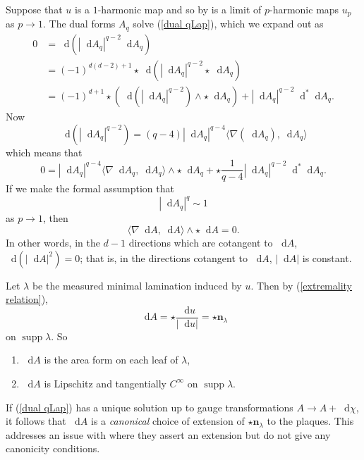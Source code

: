 \documentclass[reqno,12pt]{amsart}
\DeclareMathOperator{\supp}{supp}
\newcommand{\normal}{\mathbf n}
\newcommand*\dif{\mathop{}\!\mathrm{d}}
\theoremstyle{definition}
\numberwithin{equation}{section}
\begin{document}
Suppose that $u$ is a $1$-harmonic map and so by \cite{Mazon14} is a limit of $p$-harmonic maps $u_p$ as $p \to 1$.
The dual forms $A_q$ solve (\ref{dual qLap}), which we expand out as 
\begin{align*}
0
&= \dif(|\dif A_q|^{q - 2} \dif A_q) \\
&= (-1)^{d(d - 2) + 1} \star \dif(|\dif A_q|^{q - 2} \star \dif A_q) \\
&= (-1)^{d + 1} \star(\dif(|\dif A_q|^{q - 2}) \wedge \star \dif A_q) + |\dif A_q|^{q - 2} \dif^* \dif A_q.
\end{align*}
Now
$$\dif(|\dif A_q|^{q - 2}) = (q - 4) |\dif A_q|^{q - 4} \langle \nabla (\dif A_q), \dif A_q \rangle$$
which means that 
$$0 = |\dif A_q|^{q - 4} \langle \nabla \dif A_q, \dif A_q \rangle \wedge \star \dif A_q + \star \frac{1}{q - 4} |\dif A_q|^{q - 2} \dif^* \dif A_q.$$
If we make the formal assumption that 
$$|\dif A_q|^q \sim 1$$
as $p \to 1$, then 
$$\langle \nabla \dif A, \dif A\rangle \wedge \star \dif A = 0.$$
In other words, in the $d - 1$ directions which are cotangent to $\dif A$, $\dif(|\dif A|^2) = 0$; that is, in the directions cotangent to $\dif A$, $|\dif A|$ is constant.

Let $\lambda$ be the measured minimal lamination induced by $u$.
Then by (\ref{extremality relation}),
$$\dif A = \star \frac{\dif u}{|\dif u|} = \star \normal_\lambda$$
on $\supp \lambda$. 
So
\begin{enumerate}
\item $\dif A$ is the area form on each leaf of $\lambda$,
\item $\dif A$ is Lipschitz and tangentially $C^\infty$ on $\supp \lambda$.
\end{enumerate}
If (\ref{dual qLap}) has a unique solution up to gauge transformations $A \to A + \dif \chi$, it follows that $\dif A$ is a \emph{canonical} choice of extension of $\star \normal_\lambda$ to the plaques.
This addresses an issue with \cite{Mazon14} where they assert an extension but do not give any canonicity conditions.



\printbibliography
\end{document}
